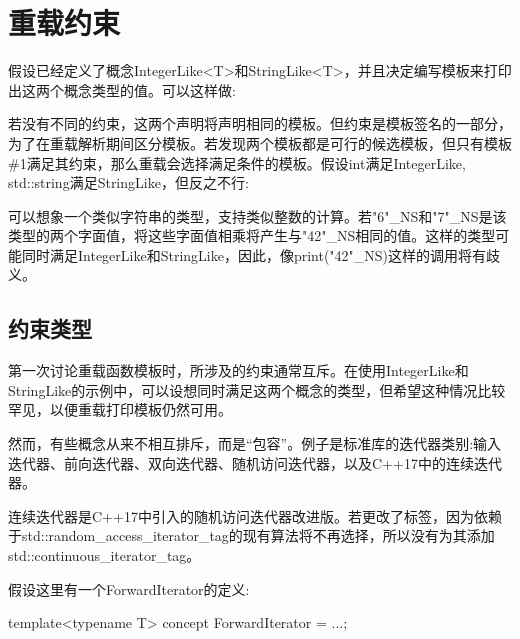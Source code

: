 \section{重载约束}

假设已经定义了概念IntegerLike<T>和StringLike<T>，并且决定编写模板来打印出这两个概念类型的值。可以这样做:


若没有不同的约束，这两个声明将声明相同的模板。但约束是模板签名的一部分，为了在重载解析期间区分模板。若发现两个模板都是可行的候选模板，但只有模板\#1满足其约束，那么重载会选择满足条件的模板。假设int满足IntegerLike, std::string满足StringLike，但反之不行:


可以想象一个类似字符串的类型，支持类似整数的计算。若"6"\_NS和"7"\_NS是该类型的两个字面值，将这些字面值相乘将产生与"42"\_NS相同的值。这样的类型可能同时满足IntegerLike和StringLike，因此，像print("42"\_NS)这样的调用将有歧义。

\subsection{约束类型}

第一次讨论重载函数模板时，所涉及的约束通常互斥。在使用IntegerLike和StringLike的示例中，可以设想同时满足这两个概念的类型，但希望这种情况比较罕见，以便重载打印模板仍然可用。

然而，有些概念从来不相互排斥，而是“包容”。例子是标准库的迭代器类别:输入迭代器、前向迭代器、双向迭代器、随机访问迭代器，以及C++17中的连续迭代器。

\begin{notice}
连续迭代器是C++17中引入的随机访问迭代器改进版。若更改了标签，因为依赖于std::random\_access\_iterator\_tag的现有算法将不再选择，所以没有为其添加std::continuous\_iterator\_tag。
\end{notice}

假设这里有一个ForwardIterator的定义:

\begin{cpp}
template<typename T>
	concept ForwardIterator = ...;
\end{cpp}

